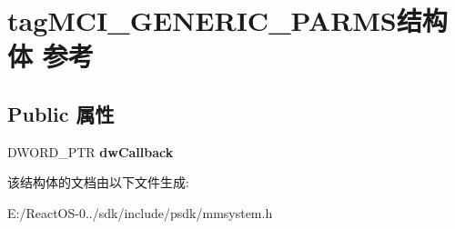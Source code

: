 \hypertarget{structtag_m_c_i___g_e_n_e_r_i_c___p_a_r_m_s}{}\section{tag\+M\+C\+I\+\_\+\+G\+E\+N\+E\+R\+I\+C\+\_\+\+P\+A\+R\+M\+S结构体 参考}
\label{structtag_m_c_i___g_e_n_e_r_i_c___p_a_r_m_s}
\subsection*{Public 属性}
\begin{DoxyCompactItemize}
\item 
\mbox{\label{structtag_m_c_i___g_e_n_e_r_i_c___p_a_r_m_s_aae1b770bd10445f1147a522110544412}} 
D\+W\+O\+R\+D\+\_\+\+P\+TR {\bfseries dw\+Callback}
\end{DoxyCompactItemize}


该结构体的文档由以下文件生成\+:\begin{DoxyCompactItemize}
\item 
E\+:/\+React\+O\+S-\/0../sdk/include/psdk/mmsystem.\+h\end{DoxyCompactItemize}
